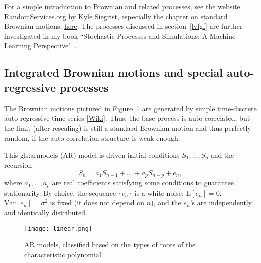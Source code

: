 \documentclass[oneside,10pt]{book}
\begin{document}
For a simple introduction to Brownian and related processes, see the website RandomServices.org by Kyle Siegrist, especially the chapter on
standard Brownian motions, \href{https://www.randomservices.org/random/brown/Standard.html}{here}. The processes discussed in
 section~\ref{lvfgf} are further investigated in my book ``Stochastic Processes and Simulations: A Machine Learning Perspective"~\cite{vgsimulnew}.
 


\subsection{Integrated Brownian motions and special auto-regressive processes}

The Brownian motions pictured in Figure~\ref{fig:linearbv2} are generated by simple time-discrete \textcolor{index}{auto-regressive time series} 
 [\href{https://en.wikipedia.org/wiki/Autoregressive_model}{Wiki}]. Thus, the base process is auto-correlated, but the limit (after rescaling) is still
 a standard Brownian motion and thus perfectly random, if the auto-correlation structure is weak enough.  

This \gls{gls:armodels} (AR) model is driven initial conditions $S_1,\dots,S_p$ and the recursion
$$
S_n=a_1 S_{n-1}+\dots + a_p S_{n-p}+e_n,
$$ 
where $a_1,\dots,a_p$ are real coefficients satisfying some conditions to guarantee \textcolor{index}{stationarity}. By choice, the sequence $\{e_n\}$ is  a \textcolor{index}{white noise}: $\text{E}[e_n]=0$, $\text{Var}[e_n]=\sigma^2$ is fixed (it does not depend on $n$), and the 
 $e_n$'s are independently and identically distributed. 

\begin{figure}[H]
\centering
\texttt{[image: linear.png]} %
\caption{AR models, classified based on the types of roots of the characteristic polynomial}
\label{fig:linearbv2}
\end{figure}
\end{document}
